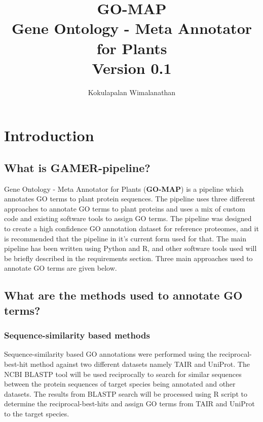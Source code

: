 \documentclass[11pt,letterpaper]{article}
\title{
  GO-MAP\\
  \Large{ Gene Ontology - Meta Annotator for Plants} \\
  \large {Version 0.1}
}
\author{Kokulapalan Wimalanathan}
\begin{document}

\maketitle
\newpage

\section{Introduction}

\subsection{What is GAMER-pipeline?}
Gene Ontology - Meta Annotator for Plants (\textbf{GO-MAP}) is a pipeline which
annotates GO terms to plant protein sequences. The pipeline uses three different
approaches to annotate GO terms to plant proteins and uses a mix of custom code
and existing software tools to assign GO terms. The pipeline was designed to
create a high confidence GO annotation dataset for reference proteomes, and it
is recommended that the pipeline in it's current form used for that. The main
pipeline has been written using Python and R, and other software tools used will
be briefly described in the requirements section. Three main approaches used to
annotate GO terms are given below.

\subsection{What are the methods used to annotate GO terms?}

\subsubsection{Sequence-similarity based methods}
Sequence-similarity based GO annotations were performed using the reciprocal-best-hit method against two different datasets namely TAIR and UniProt. The NCBI BLASTP tool will be used reciprocally to search for similar sequences between the protein sequences of target species being annotated and other datasets. The results from BLASTP search will be processed using R script to determine the reciprocal-best-hits and assign GO terms from TAIR and UniProt to the target species.
\end{document}
